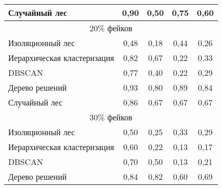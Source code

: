 \begin{table}[H]
\begin{tabular}{|lllll|}
    \multicolumn{1}{|l|}{Случайный лес} & \multicolumn{1}{c|}{0,90} & \multicolumn{1}{c|}{0,50} & \multicolumn{1}{c|}{0,75} & \multicolumn{1}{c|}{0,60} \\ \hline


    
    \multicolumn{5}{|c|}{20\% фейков} \\ \hline
    \multicolumn{1}{|l|}{Изоляционный лес} & \multicolumn{1}{c|}{0,48} & \multicolumn{1}{c|}{0,18} & \multicolumn{1}{c|}{0,44} & \multicolumn{1}{c|}{0,26} \\ \hline
    
    \multicolumn{1}{|l|}{Иерархическая кластеризация} & \multicolumn{1}{c|}{0,82} & \multicolumn{1}{c|}{0,67} & \multicolumn{1}{c|}{0,22} & \multicolumn{1}{c|}{0,33} \\ \hline
    
    \multicolumn{1}{|l|}{DBSCAN} & \multicolumn{1}{c|}{0,77} & \multicolumn{1}{c|}{0,40} & \multicolumn{1}{c|}{0,22} & \multicolumn{1}{c|}{0,29} \\ \hline

    \multicolumn{1}{|l|}{Дерево решений} & \multicolumn{1}{c|}{0,93} & \multicolumn{1}{c|}{0,80} & \multicolumn{1}{c|}{0,89} & \multicolumn{1}{c|}{0,84} \\ \hline
    
    \multicolumn{1}{|l|}{Случайный лес} & \multicolumn{1}{c|}{0,86} & \multicolumn{1}{c|}{0,67} & \multicolumn{1}{c|}{0,67} & \multicolumn{1}{c|}{0,67} \\ \hline


    
    \multicolumn{5}{|c|}{30\% фейков} \\ \hline
    \multicolumn{1}{|l|}{Изоляционный лес} & \multicolumn{1}{c|}{0,50} & \multicolumn{1}{c|}{0,25} & \multicolumn{1}{c|}{0,33} & \multicolumn{1}{c|}{0,29} \\ \hline
    
    \multicolumn{1}{|l|}{Иерархическая кластеризация} & \multicolumn{1}{c|}{0,60} & \multicolumn{1}{c|}{0,22} & \multicolumn{1}{c|}{0,13} & \multicolumn{1}{c|}{0,17} \\ \hline
    
    \multicolumn{1}{|l|}{DBSCAN} & \multicolumn{1}{c|}{0,70} & \multicolumn{1}{c|}{0,50} & \multicolumn{1}{c|}{0,13} & \multicolumn{1}{c|}{0,21} \\ \hline

    \multicolumn{1}{|l|}{Дерево решений} & \multicolumn{1}{c|}{0,84} & \multicolumn{1}{c|}{0,82} & \multicolumn{1}{c|}{0,60} & \multicolumn{1}{c|}{0,69} \\ \hline
    

\end{tabular}
\end{table}

